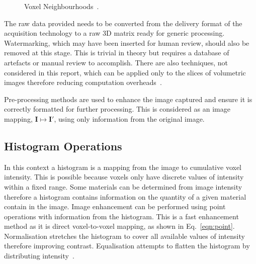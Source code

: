 \documentclass[journal]{IEEEtran}
\begin{document}
\begin{figure}
	\centering
\caption{Voxel Neighbourhoods~\cite{lohmann1998volumetric}.}
\label{fig:neighbourhood}
\end{figure}


The raw data provided needs to be converted from the delivery format of the acquisition technology to a raw 3D matrix ready for generic processing.
Watermarking, which may have been inserted for human review, should also be removed at this stage. 
This is trivial in theory but requires a database of artefacts or manual review to accomplish.
There are also techniques, not considered in this report, which can be applied only to the slices of volumetric images therefore reducing computation overheads~\cite{harauz86exact}.

Pre-processing methods are used to enhance the image captured and ensure it is correctly formatted for further processing.
This is considered as an image mapping, $\textbf{I} \mapsto \textbf{I}'$, using only information from the original image.

\subsection{Histogram Operations}

In this context a histogram is a mapping from the image to cumulative voxel intensity.
This is possible because voxels only have discrete values of intensity within a fixed range.
Some materials can be determined from image intensity therefore a histogram contains information on the quantity of a given material contain in the image.
Image enhancement can be performed using point operations with information from the histogram.
This is a fast enhancement method as it is direct voxel-to-voxel mapping, as shown in Eq.~\eqref{eqn:point}. 
Normalisation stretches the histogram to cover all available values of intensity therefore improving contrast.
Equalisation attempts to flatten the histogram by distributing intensity~\cite{nixon02feature}.
\end{document}
